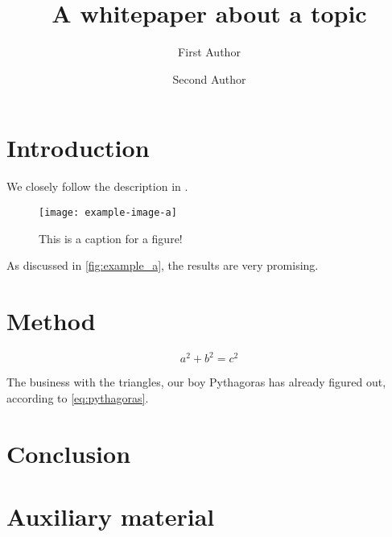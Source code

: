 \documentclass[12pt,a4paper]{scrarticle}
\title{A whitepaper about a topic}
\author{First Author \and Second Author}
\begin{document}
\maketitle

\begin{abstract}
    \lipsum[2-4] 
\end{abstract}

\tableofcontents

\section{Introduction}

We closely follow the description in \cite{adams1995}.

\begin{figure}[ht]
    \centering
    \texttt{[image: example-image-a]}
    \caption{This is a caption for a figure!}
    \label{fig:example_a}
\end{figure}

\lipsum[1] 

As discussed in \autoref{fig:example_a}, the results are very promising.

\section{Method}

\lipsum[1] 

\begin{equation}
    a^2 + b^2 = c^2
    \label{eq:pythagoras}
\end{equation}

The business with the triangles, our boy Pythagoras has already figured out, according to \autoref{eq:pythagoras}.

\section{Conclusion}

\lipsum[1] 

\appendix

\section{Auxiliary material}

\lipsum[1] 

\printbibliography{}
\end{document}
